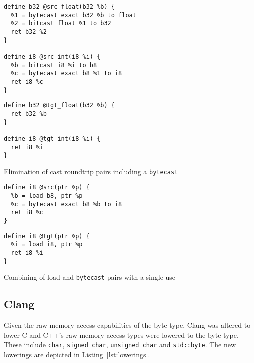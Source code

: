 \documentclass[a4paper,12pt]{article}
\begin{document}
\begin{listing}[h]
  \begin{minipage}{0.5\textwidth}
    \begin{verbatim}
define b32 @src_float(b32 %b) {
  %1 = bytecast exact b32 %b to float
  %2 = bitcast float %1 to b32
  ret b32 %2
}

define i8 @src_int(i8 %i) {
  %b = bitcast i8 %i to b8
  %c = bytecast exact b8 %1 to i8
  ret i8 %c
}
    \end{verbatim}
  \end{minipage}
  \begin{minipage}{0.45\textwidth}
    \begin{verbatim}
define b32 @tgt_float(b32 %b) {
  ret b32 %b
}

define i8 @tgt_int(i8 %i) {
  ret i8 %i
}
    \end{verbatim}
  \end{minipage}
  \caption{Elimination of cast roundtrip pairs including a \texttt{bytecast}}
  \label{lst:bytecast-elim}
\end{listing}

\begin{listing}[H]
  \begin{minipage}{0.5\textwidth}
    \begin{verbatim}
define i8 @src(ptr %p) {
  %b = load b8, ptr %p
  %c = bytecast exact b8 %b to i8
  ret i8 %c
}
    \end{verbatim}
  \end{minipage}
  \begin{minipage}{0.45\textwidth}
    \begin{verbatim}
define i8 @tgt(ptr %p) {
  %i = load i8, ptr %p
  ret i8 %i
}
    \end{verbatim}
  \end{minipage}
  \caption{Combining of load and \texttt{bytecast} pairs with a single use}
  \label{lst:single-use}
\end{listing}

\subsection{Clang}

Given the raw memory access capabilities of the byte type, Clang was altered to lower C and C++'s raw memory access types were lowered to the byte type.
These include \texttt{char}, \texttt{signed char}, \texttt{unsigned char} and \texttt{std::byte}.
The new lowerings are depicted in Listing~\ref{lst:lowerings}.
\end{document}
